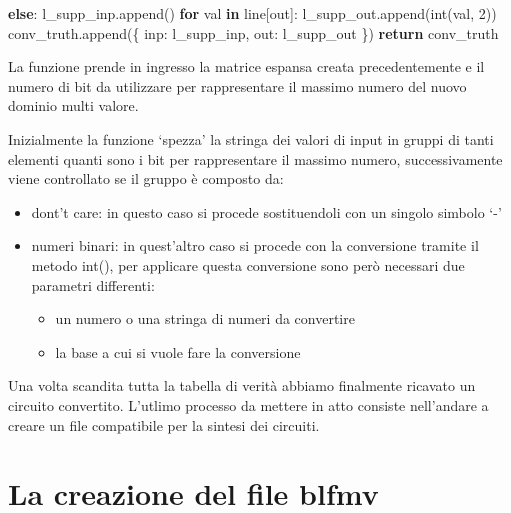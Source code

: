 \documentclass[
]{book}
\newenvironment{Shaded}{\begin{snugshade}}{\end{snugshade}}
\newcommand{\BuiltInTok}[1]{#1}
\newcommand{\ControlFlowTok}[1]{\textcolor[rgb]{0.13,0.29,0.53}{\textbf{#1}}}
\newcommand{\DecValTok}[1]{\textcolor[rgb]{0.00,0.00,0.81}{#1}}
\newcommand{\KeywordTok}[1]{\textcolor[rgb]{0.13,0.29,0.53}{\textbf{#1}}}
\newcommand{\NormalTok}[1]{#1}
\newcommand{\StringTok}[1]{\textcolor[rgb]{0.31,0.60,0.02}{#1}}
\providecommand{\tightlist}{%
  \setlength{\itemsep}{0pt}\setlength{\parskip}{0pt}}
\begin{document}
\begin{Shaded}
\begin{Highlighting}[]
        \ControlFlowTok{else}\NormalTok{:}
\NormalTok{          l\_supp\_inp.append(}\StringTok{\textquotesingle{}{-}\textquotesingle{}}\NormalTok{)}
      \ControlFlowTok{for}\NormalTok{ val }\KeywordTok{in}\NormalTok{ line[}\StringTok{\textquotesingle{}out\textquotesingle{}}\NormalTok{]:}
\NormalTok{        l\_supp\_out.append(}\BuiltInTok{int}\NormalTok{(val, }\DecValTok{2}\NormalTok{))}
\NormalTok{      conv\_truth.append(\{}
        \StringTok{\textquotesingle{}inp\textquotesingle{}}\NormalTok{:  l\_supp\_inp,}
        \StringTok{\textquotesingle{}out\textquotesingle{}}\NormalTok{:  l\_supp\_out}
\NormalTok{      \})}
  \ControlFlowTok{return}\NormalTok{ conv\_truth}
\end{Highlighting}
\end{Shaded}

La funzione prende in ingresso la matrice espansa creata precedentemente e il numero di bit da utilizzare per rappresentare il massimo numero del nuovo dominio multi valore.

\newpage

Inizialmente la funzione `spezza' la stringa dei valori di input in gruppi di tanti elementi quanti sono i bit per rappresentare il massimo numero, successivamente viene controllato se il gruppo è composto da:

\begin{itemize}
\tightlist
\item
  dont't care: in questo caso si procede sostituendoli con un singolo simbolo `-'
\item
  numeri binari: in quest'altro caso si procede con la conversione tramite il metodo int(), per applicare questa conversione sono però necessari due parametri differenti:

  \begin{itemize}
  \tightlist
  \item
    un numero o una stringa di numeri da convertire
  \item
    la base a cui si vuole fare la conversione
  \end{itemize}
\end{itemize}

Una volta scandita tutta la tabella di verità abbiamo finalmente ricavato un circuito convertito. L'utlimo processo da mettere in atto consiste nell'andare a creare un file compatibile per la sintesi dei circuiti.

\hypertarget{la-creazione-del-file-blfmv}{%
\section{La creazione del file blfmv}\label{la-creazione-del-file-blfmv}}
\end{document}
